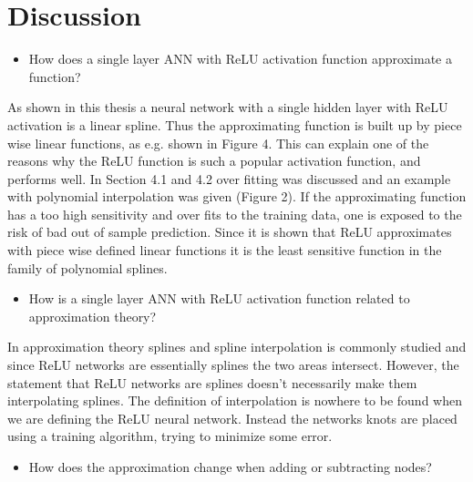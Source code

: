 \documentclass[11pt, letterpaper]{amsart}
\begin{document}
\newpage

\section{Discussion}
\begin{itemize}
\item How does a single layer ANN with ReLU activation function approximate a function?
\end{itemize}
\vspace{0.5cm}

As shown in this thesis a neural network with a single hidden layer with ReLU activation is a linear spline. Thus the approximating function is built up by piece wise linear functions, as e.g. shown in Figure 4. This can explain one of the reasons why the ReLU function is such a popular activation function, and performs well. In Section 4.1 and 4.2 over fitting was discussed and an example with polynomial interpolation was given (Figure 2). If the approximating function has a too high sensitivity and over fits to the training data, one is exposed to the risk of bad out of sample prediction. Since it is shown that ReLU approximates with piece wise defined linear functions it is the least sensitive function in the family of polynomial splines.
\\

\begin{itemize}
\item How is a single layer ANN with ReLU activation function related to approximation theory?
\end{itemize}
\vspace{0.5cm}

In approximation theory splines and spline interpolation is commonly studied and since ReLU networks are essentially splines the two areas intersect. However, the statement that ReLU networks are splines doesn't necessarily make them interpolating splines. The definition of interpolation is nowhere to be found when we are defining the ReLU neural network. Instead the networks knots are placed using a training algorithm, trying to minimize some error.
\\

\begin{itemize}
\item How does the approximation change when adding or subtracting nodes?
\end{itemize}
\vspace{0.5cm}
\end{document}
